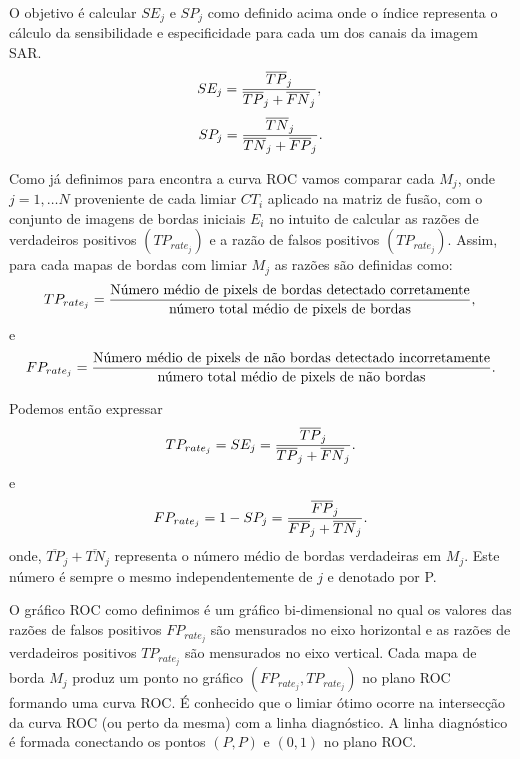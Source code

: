O objetivo é calcular $SE_j$ e $SP_j$ como definido acima onde o índice representa o cálculo da sensibilidade e especificidade para cada um dos canais da imagem SAR.
\begin{equation}\label{cap_fusao_19}
	SE_j=\frac{\overline{TP}_j}{\overline{TP}_j+\overline{FN}_j}, \\
\end{equation}
\begin{equation}\label{cap_fusao_20}
	SP_j=\frac{\overline{TN}_j}{\overline{TN}_j+\overline{FP}_j}. \\
\end{equation}

Como já definimos para encontra a curva ROC vamos comparar cada $M_j$, onde $j=1,\dots N$ proveniente de cada limiar $CT_i$ aplicado na matriz de fusão, com o conjunto de imagens de bordas iniciais $E_i$ no intuito de calcular as razões de verdadeiros positivos $(TP_{rate_{j}})$ e a razão de falsos positivos $(TP_{rate_{j}})$. Assim, para cada  mapas de bordas com limiar $M_j$ as razões são definidas como:  
\begin{equation}\label{cap_fusao_21}
	TP_{rate_{j}}=\frac{\text{Número médio de pixels de bordas detectado corretamente}}{\text{número total médio de pixels de bordas}}, \\
\end{equation}
e 
\begin{equation}\label{cap_fusao_22}
	FP_{rate_{j}}=\frac{\text{Número médio de pixels de não bordas detectado incorretamente}}{\text{número total médio de pixels de não bordas}}. \\
\end{equation}

Podemos então expressar 
\begin{equation}\label{cap_fusao_23}
	TP_{rate_{j}}=SE_j=\frac{\overline{TP}_j}{\overline{TP}_j+\overline{FN}_j}. \\
\end{equation}
e
\begin{equation}\label{cap_fusao_24}
	FP_{rate_{j}}=1 - SP_j=\frac{\overline{FP}_j}{\overline{FP}_j+\overline{TN}_j}. \\
\end{equation}
onde, $\overline{TP}_j+\overline{TN}_j$ representa o número médio de bordas verdadeiras em $M_j$. Este número é sempre o mesmo independentemente de $j$ e denotado por P.

O gráfico ROC como definimos é um gráfico bi-dimensional no qual os valores das razões de falsos positivos $FP_{rate_j}$ são mensurados no eixo horizontal e as razões de verdadeiros positivos $TP_{rate_j}$ são mensurados no eixo vertical. Cada mapa de borda $M_j$ produz um ponto no gráfico $(FP_{rate_j}, TP_{rate_j})$ no plano ROC formando uma curva ROC. É conhecido que o limiar ótimo ocorre na intersecção da curva ROC (ou perto da mesma) com a linha diagnóstico. A linha diagnóstico é formada conectando os pontos $(P,P)$ e $(0,1)$ no plano ROC. 

